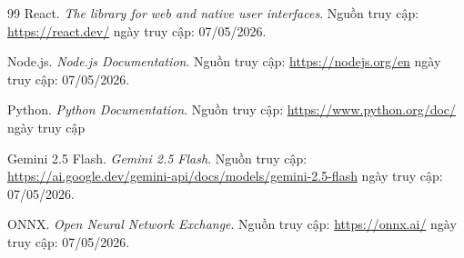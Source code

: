 \begin{thebibliography}{99}
React. \textit{The library for web and native user interfaces}. 
Nguồn truy cập: \url{https://react.dev/} ngày truy cập: 07/05/2026.

Node.js. \textit{Node.js Documentation}. 
Nguồn truy cập: \url{https://nodejs.org/en} ngày truy cập: 07/05/2026.

Python. \textit{Python Documentation}. 
Nguồn truy cập: \url{https://www.python.org/doc/} ngày truy cập

Gemini 2.5 Flash. \textit{Gemini 2.5 Flash}. 
Nguồn truy cập: \url{https://ai.google.dev/gemini-api/docs/models/gemini-2.5-flash} ngày truy cập: 07/05/2026.

ONNX. \textit{Open Neural Network Exchange}. 
Nguồn truy cập: \url{https://onnx.ai/} ngày truy cập: 07/05/2026.

\end{thebibliography}